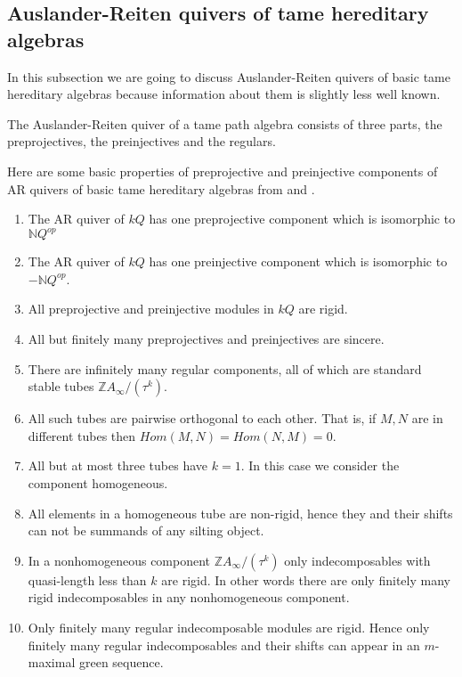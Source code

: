 \subsection{Auslander-Reiten quivers of tame hereditary algebras}
\indent In this subsection we are going to discuss Auslander-Reiten quivers of basic tame hereditary algebras because information about them is slightly less well known.\\
\begin{theorem}
\indent \cite{DR76} The Auslander-Reiten quiver of a tame path algebra consists of three parts, the preprojectives, the preinjectives and the regulars.
\end{theorem}
\indent Here are some basic properties of preprojective and preinjective components of AR quivers of basic tame hereditary algebras from \cite{ASS06} and \cite{SS06}.
\begin{theorem}\label{Tame}
\begin{enumerate}
\item The AR quiver of $kQ$ has one preprojective component which is isomorphic to $\mathbb{N}Q^{op}$
\item The AR quiver of $kQ$ has one preinjective component which is isomorphic to $-\mathbb{N}Q^{op}$.
\item All preprojective and preinjective modules in $kQ$ are rigid.
\item All but finitely many preprojectives and preinjectives are sincere.
\item There are infinitely many regular components, all of which are standard stable tubes $\mathbb{Z}A_{\infty}/(\tau^k)$.
\item All such tubes are pairwise orthogonal to each other. That is, if $M,N$ are in different tubes then $Hom (M,N) = Hom (N,M) = 0$.
\item All but at most three tubes have $k=1$. In this case we consider the component homogeneous.
\item All elements in a homogeneous tube are non-rigid, hence they and their shifts can not be summands of any silting object.
\item In a nonhomogeneous component $\mathbb{Z}A_{\infty}/(\tau^k)$ only indecomposables with quasi-length less than $k$ are rigid. In other words there are only finitely many rigid indecomposables in any nonhomogeneous component.
\item Only finitely many regular indecomposable modules are rigid. Hence only finitely many regular indecomposables and their shifts can appear in an $m$-maximal green sequence.
\end{enumerate}
\end{theorem}
